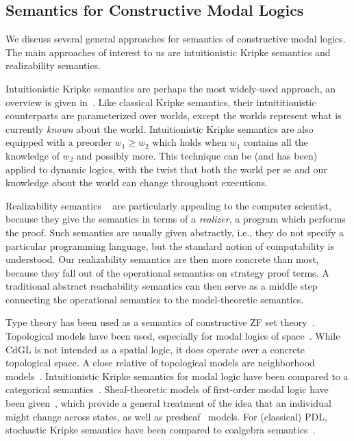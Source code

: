 \documentclass[12pt]{cmuthesis}
\theoremstyle{definition}
\theoremstyle{remark}
\newcommand{\CdGL}{\textsf{CdGL}\xspace}
\begin{document}
\subsection{Semantics for Constructive Modal Logics}
We discuss several general approaches for semantics of constructive modal logics.
The main approaches of interest to us are intuitionistic Kripke semantics and realizability semantics.

Intuitionistic Kripke semantics are perhaps the most widely-used approach, an overview is given in~\cite{DBLP:journals/apal/Wijesekera90}.
Like classical Kripke semantics, their intuititionistic counterparts are parameterized over worlds, except the worlds represent what is currently \emph{known} about the world.
Intuitionistic Kripke semantics are also equipped with a preorder $w_1 \geq w_2$ which holds when $w_1$ contains all the knowledge of $w_2$ and possibly more.
This technique can be (and has been) applied to dynamic logics, with the twist that both the world per se and our knowledge about the world can change throughout executions.

Realizability semantics ~\cite{DBLP:journals/mscs/Oosten02,lipton1992constructive} are particularly appealing to the computer scientist, because they give the semantics in terms of a \emph{realizer}, a program which performs the proof.
Such semantics are usually given abstractly, i.e., they do not specify a particular programming language, but the standard notion of computability is understood.
Our realizability semantics are then more concrete than most, because they fall out of the operational semantics on strategy proof terms.
A traditional abstract reachability semantics can then serve as a middle step connecting the operational semantics to the model-theoretic semantics.

Type theory has been used as a semantics of constructive ZF set theory~\cite{DBLP:journals/jsyml/AczelG06}.
Topological models have been used, especially for modal logics of space~\cite{DBLP:reference/spatial/BenthemB07}.
While \CdGL is not intended as a spatial logic, it does operate over a concrete topological space.
A close relative of topological models are neighborhood models~\cite{DBLP:conf/lori/BenthemBE17}.
Intuitionistic Kripke semantics for modal logic have been compared to a categorical semantics~\cite{DBLP:conf/csl/AlechinaMPR01}.
Sheaf-theoretic models of first-order modal logic have been given~\cite{Hilken_afirst}, which provide a general treatment of the idea that an individual might change across states, as well as presheaf~\cite{DBLP:journals/aml/Ghilardi89} models.
For (classical) PDL, stochastic Kripke semantics have been compared to coalgebra semantics~\cite{DBLP:journals/corr/abs-1109-3685}.
\end{document}

